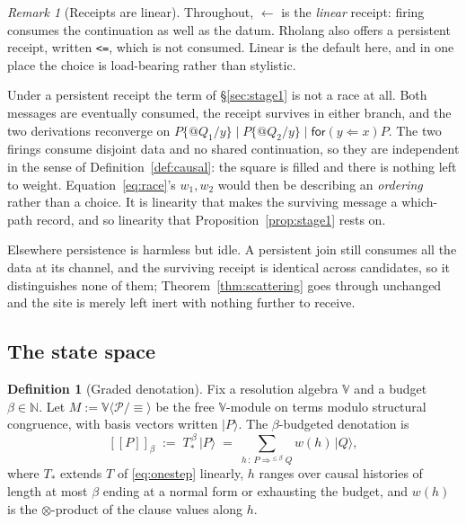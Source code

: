 \documentclass[11pt,a4paper]{article}
\theoremstyle{plain}
\theoremstyle{definition}
\newtheorem{definition}[theorem]{Definition}
\theoremstyle{remark}
\newtheorem{remark}[theorem]{Remark}
\newcommand{\sem}[1]{[\![#1]\!]}
\newcommand{\V}{\mathbb{V}}
\newcommand{\Nat}{\mathbb{N}}
\newcommand{\Proc}{\mathcal{P}}
\newcommand{\scong}{\equiv}
\newcommand{\tensorv}{\otimes}
\begin{document}
\begin{remark}[Receipts are linear]\label{rem:linear}
Throughout, $\leftarrow$ is the \emph{linear} receipt: firing consumes the
continuation as well as the datum. Rholang also offers a persistent receipt,
written \texttt{<=}, which is not consumed. Linear is the default here, and in
one place the choice is load-bearing rather than stylistic.

Under a persistent receipt the term of \S\ref{sec:stage1} is not a race at all.
Both messages are eventually consumed, the receipt survives in either branch, and
the two derivations reconverge on
$P\{@Q_1/y\} \mid P\{@Q_2/y\} \mid \textsf{for}(y \Leftarrow x)P$. The two
firings consume disjoint data and no shared continuation, so they are independent
in the sense of Definition~\ref{def:causal}: the square is filled and there is
nothing left to weight. Equation~\eqref{eq:race}'s $w_1, w_2$ would then be
describing an \emph{ordering} rather than a choice. It is linearity that makes
the surviving message a which-path record, and so linearity that
Proposition~\ref{prop:stage1} rests on.

Elsewhere persistence is harmless but idle. A persistent join still consumes all
the data at its channel, and the surviving receipt is identical across
candidates, so it distinguishes none of them; Theorem~\ref{thm:scattering} goes
through unchanged and the site is merely left inert with nothing further to
receive.
\end{remark}

\subsection{The state space}

\begin{definition}[Graded denotation]\label{def:denotation}
Fix a resolution algebra $\V$ and a budget $\beta \in \Nat$. Let
$M := \V\langle \Proc/{\scong}\rangle$ be the free $\V$-module on terms modulo
structural congruence, with basis vectors written $\lvert P \rangle$. The
$\beta$-budgeted denotation is
\[
  \sem{P}_\beta \;:=\; T_{\!*}^{\,\beta}\,\lvert P \rangle
  \;=\;\!\!\sum_{h \,:\, P \Rightarrow^{\leq\beta} Q}\!\! w(h)\,\lvert Q\rangle ,
\]
where $T_*$ extends $T$ of \eqref{eq:onestep} linearly, $h$ ranges over causal
histories of length at most $\beta$ ending at a normal form or exhausting the
budget, and $w(h)$ is the $\tensorv$-product of the clause values along $h$.
\end{definition}
\end{document}
